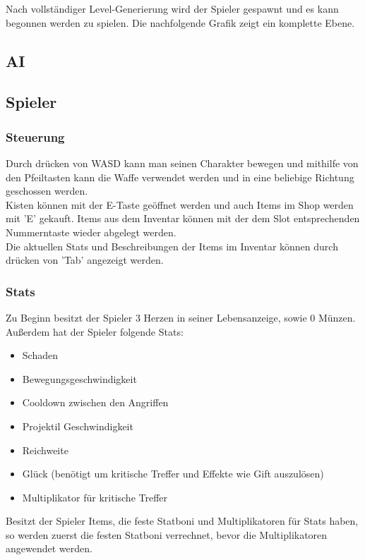 Nach vollständiger Level-Generierung wird der Spieler gespawnt und es kann begonnen werden zu spielen.
Die nachfolgende Grafik zeigt ein komplette Ebene.


\subsection{AI}

\subsection{Spieler}
\subsubsection{Steuerung}
Durch drücken von WASD kann man seinen Charakter bewegen und mithilfe von den Pfeiltasten kann die Waffe verwendet werden und in eine beliebige Richtung geschossen werden. \\
Kisten können mit der E-Taste geöffnet werden und auch Items im Shop werden mit 'E' gekauft. Items aus dem Inventar können mit der dem Slot entsprechenden Nummerntaste wieder abgelegt werden. \\
Die aktuellen Stats und Beschreibungen der Items im Inventar können durch drücken von 'Tab' angezeigt werden.

\subsubsection{Stats}
Zu Beginn besitzt der Spieler 3 Herzen in seiner Lebensanzeige, sowie 0 Münzen. Außerdem hat der Spieler folgende Stats:
\begin{itemize}
\item Schaden
\item Bewegungsgeschwindigkeit
\item Cooldown zwischen den Angriffen
\item Projektil Geschwindigkeit
\item Reichweite
\item Glück (benötigt um kritische Treffer und Effekte wie Gift auszulösen)
\item Multiplikator für kritische Treffer
\end{itemize}
Besitzt der Spieler Items, die feste Statboni und Multiplikatoren für Stats haben, so werden zuerst die festen Statboni verrechnet, bevor die Multiplikatoren angewendet werden.

